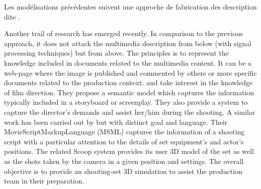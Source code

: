 Les modélisations précédentes suivent une approche de fabrication des description dite . 


Another trail of research has emerged recently. 
In comparison to the previous approach, it does not attack the multimedia description from below (with signal processing techniques) but from above. 
The principles is to represent the knowledge included in documents related to the multimedia content. 
It can be a web-page where the image is published and commented by others \cite{Simperl2009} or more specific documents related to the production context. 
\cite{Chakravarthy2009b} and \cite{Chakravarthy2009c} take interest in the knowledge of film direction. 
They propose a semantic model which captures the information typically included in a storyboard or screenplay. 
They also provide a system to capture the director's demands and assist her/him during the shooting. 
A similar work has been carried out by \cite{VanRijsselbergen2009} but with distinct goal and language. 
Their MovieScriptMarkupLanguage (MSML) captures the information of a shooting script with a particular attention to the details of set equipment's and actor's positions. 
The related Scoop system \cite{Cardinaels2008} provides its user 3D model of the set as well as the shots taken by the camera in a given position and settings. 
The overall objective is to provide an shooting-set 3D simulation to assist the production team in their preparation.\\







